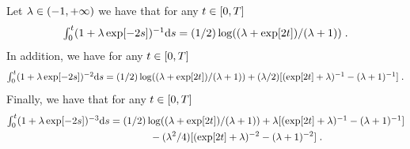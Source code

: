   \begin{lemma}
    \label{lemma:integral_changement}
    Let $\lambda \in \left(-1, +\infty\right)$ we have that for any $t \in \left[0,T\right]$
    \begin{equation}
      \textstyle{\int_0^t (1 + \lambda \exp[-2s])^{-1}} \mathrm{d} s = (1/2) \log((\lambda + \exp[2t])/(\lambda +1)) \; . 
    \end{equation}
    In addition, we have for any $t \in \left[0,T\right]$
        \begin{equation}
      \textstyle{\int_0^t (1 + \lambda \exp[-2s])^{-2}} \mathrm{d} s = (1/2) \log((\lambda + \exp[2t])/(\lambda +1)) + (\lambda/2)[(\exp[2t] + \lambda)^{-1} - (\lambda + 1)^{-1}] \; .
    \end{equation}
    Finally, we have that for any $t \in \left[0,T\right]$
        \begin{align}
      \textstyle{\int_0^t (1 + \lambda \exp[-2s])^{-3}} \mathrm{d} s &=  \textstyle{(1/2) \log((\lambda + \exp[2t])/(\lambda +1)) + \lambda [(\exp[2t] + \lambda)^{-1} - (\lambda + 1)^{-1}] } \\
      & \qquad \qquad - (\lambda^2/4)[(\exp[2t] + \lambda)^{-2} - (\lambda + 1)^{-2}] \; . 
    \end{align}    
  \end{lemma}

